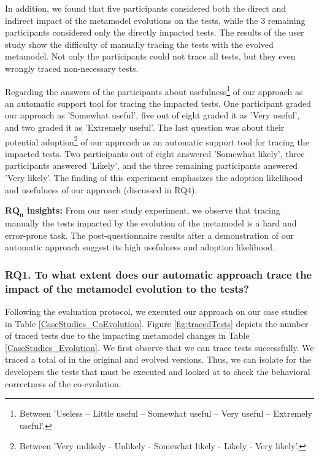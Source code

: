 {	In addition, we found that five participants considered both the direct and indirect impact of the metamodel evolutions on the tests, while the 3 remaining participants considered only the directly impacted tests. 
	The results of the user study show the difficulty of manually tracing the tests with the evolved metamodel. Not only the participants could not trace all tests, but they even wrongly traced non-necessary tests. 
	
	Regarding the answers of the participants about usefulness\footnote{Between 'Useless – Little useful – Somewhat useful – Very useful – Extremely useful'.} of our approach as an automatic support tool for tracing the impacted tests. One participant graded our approach as 'Somewhat useful', five out of eight graded it as 'Very useful', and two graded it as 'Extremely useful'. The last question was about their potential adoption\footnote{Between 'Very unlikely - Unlikely - Somewhat likely - Likely - Very likely'.}%
	of our approach as an automatic support tool for tracing the impacted tests. Two participants out of eight answered 'Somewhat likely', three participants answered 'Likely', and the three remaining participants answered 'Very likely'. The finding of this experiment emphasizes the adoption likelihood and usefulness of our approach (discussed in RQ4).
	
	\begin{tcolorbox}[boxsep=-2pt]
		\textbf{$\boldsymbol{RQ_0}$ insights:}
		From our user study experiment, we observe that tracing manually the tests impacted by the evolution of the metamodel is a hard and error-prone task. The post-questionnaire results after a demonstration of our automatic approach suggest its high usefulness and adoption likelihood.
	\end{tcolorbox}
	
}

\subsubsection{RQ1. To what extent does our automatic approach trace the impact of the metamodel evolution to the tests?}

Following the evaluation protocol, we executed our approach on our case studies in Table \ref{CaseStudies_CoEvolution}. Figure \ref{fig:tracedTests} depicts the number of traced tests due to the impacting metamodel changes in Table \ref{CaseStudies_Evolution}. We first observe that we can trace tests successfully. We traced a total of  in the original and evolved versions. Thus, we can isolate for the developers the tests that must be executed and looked at to check the behavioral correctness of the co-evolution. 

